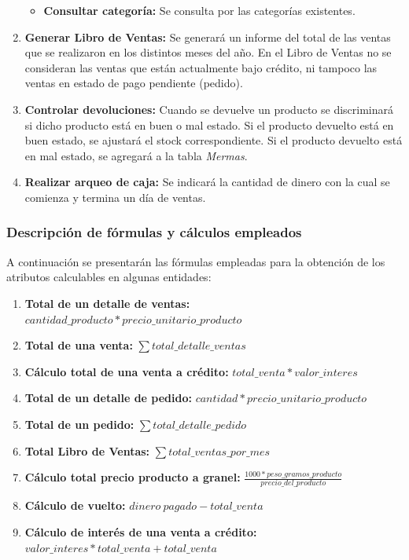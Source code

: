 \documentclass[letterpaper,12pt]{article}
\begin{document}
\begin{enumerate}
\begin{itemize}
\item \textbf{Consultar categoría:}
Se consulta por las categorías existentes.
\end{itemize}

\newpage

\item \textbf{Generar Libro de Ventas:}
Se generará un informe del total de las ventas que se realizaron en los distintos meses del año.   
En el Libro de Ventas no se consideran las ventas que están actualmente bajo crédito, ni tampoco las ventas 
en estado de pago pendiente (pedido).

\item \textbf{Controlar devoluciones:}
Cuando se devuelve un producto se discriminará si dicho producto está en buen o mal estado.
Si el producto devuelto está en buen estado, se ajustará el stock correspondiente.
Si el producto devuelto está en mal estado, se agregará a la tabla \emph{Mermas}.

\item \textbf{Realizar arqueo de caja:}
Se indicará la cantidad de dinero con la cual se comienza y termina un día de ventas.
\end{enumerate}

\newpage

\subsubsection{Descripción de fórmulas y cálculos empleados}
A continuación se presentarán las fórmulas empleadas para la obtención de los atributos
calculables en algunas entidades:

\begin{enumerate}
\item \textbf{Total de un detalle de ventas:}
$cantidad\_producto * precio\_unitario\_producto$

\item \textbf{Total de una venta:}
$\sum{total\_detalle\_ventas}$ 

\item \textbf{Cálculo total de una venta a crédito:}
$total\_venta * valor\_interes$

\item \textbf{Total de un detalle de pedido:}
$cantidad * precio\_unitario\_producto$

\item \textbf{Total de un pedido:}
$\sum{total\_detalle\_pedido}$

\item \textbf{Total Libro de Ventas:}
$\sum{total\_ventas\_por\_mes}$

\item \textbf{Cálculo total precio producto a granel:}
$\frac{1000 * peso\_gramos\_producto}{precio\_del\_producto}$ 

\item \textbf{Cálculo de vuelto:}
$dinero\ pagado - total\_venta$

\item \textbf{Cálculo de interés de una venta a crédito:}
$valor\_interes * total\_venta + total\_venta$

\end{enumerate}
\end{document}
